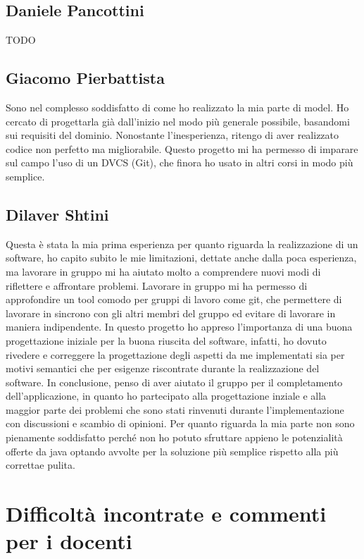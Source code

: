 \documentclass[a4paper,12pt]{report}
\begin{document}
\subsection*{Daniele Pancottini}
{TODO}

\subsection*{Giacomo Pierbattista}
Sono nel complesso soddisfatto di come ho realizzato la mia parte di model. Ho cercato di
progettarla già dall'inizio nel modo più generale possibile, basandomi sui requisiti del dominio.
Nonostante l'inesperienza, ritengo di aver realizzato codice non perfetto ma migliorabile.
Questo progetto mi ha permesso di imparare sul campo l'uso di un DVCS (Git), che finora ho usato
in altri corsi in modo più semplice.

\subsection*{Dilaver Shtini}
Questa è stata la mia prima esperienza per quanto riguarda la realizzazione di un software,
ho capito subito le mie limitazioni, dettate anche dalla poca esperienza, ma lavorare in gruppo
mi ha aiutato molto a comprendere nuovi modi di riflettere e affrontare problemi. Lavorare in gruppo
mi ha permesso di approfondire un tool comodo per gruppi di lavoro come git, che permettere di lavorare
in sincrono con gli altri membri del gruppo ed evitare di lavorare in maniera indipendente.
In questo progetto ho appreso l’importanza di una buona progettazione iniziale per la buona riuscita
del software, infatti, ho dovuto rivedere e correggere la progettazione degli aspetti da me implementati
sia per motivi semantici che per esigenze riscontrate durante la realizzazione del software.
In conclusione, penso di aver aiutato il gruppo per il completamento dell’applicazione,
in quanto ho partecipato alla progettazione inziale e alla maggior parte dei problemi che
sono stati rinvenuti durante l’implementazione con discussioni e scambio di opinioni.
Per quanto riguarda la mia parte non sono pienamente soddisfatto perché non ho potuto sfruttare appieno
le potenzialità offerte da java optando avvolte per la soluzione più semplice rispetto alla più correttae pulita.


\section{Difficoltà incontrate e commenti per i docenti}
\end{document}
